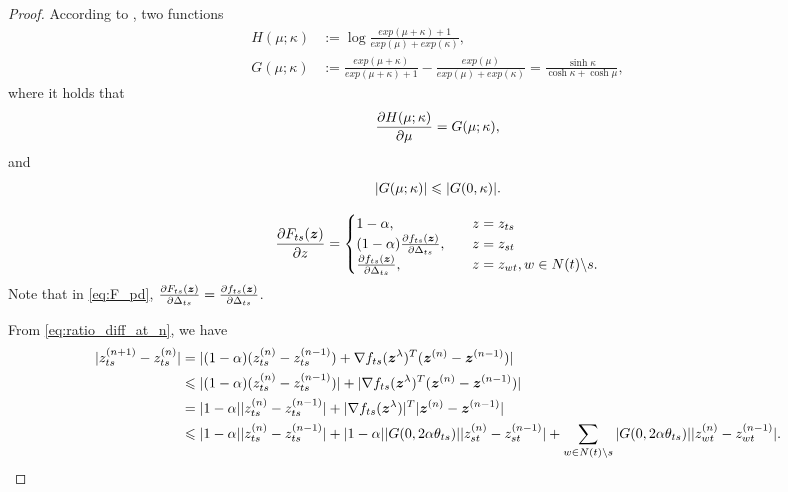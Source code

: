 \documentclass[conference,onecolumn]{IEEEtran}
\begin{document}
\begin{proof}
  According to \cite{roosta2008reweighed_sum_product}, two functions
  \begin{align}
    H(\mu; \kappa) &:= \log \frac{exp(\mu + \kappa) +1}{exp(\mu) + exp(\kappa)}, \nonumber \\
    G(\mu; \kappa) &:= \frac{exp(\mu + \kappa)}{exp(\mu + \kappa) + 1} - \frac{exp(\mu)}{exp(\mu) + exp(\kappa)} = \frac{\sinh{\kappa}}{\cosh{\kappa} + \cosh{\mu}},
  \end{align}
  where it holds that
  \begin{equation}
    \frac{ \partial H(\mu; \kappa)}{\partial \mu} = G(\mu; \kappa),
  \end{equation}
  and
  \begin{equation}
    | G(\mu; \kappa) | \leqslant | G(0, \kappa) |.
  \end{equation}

  \begin{equation}\label{eq:F_pd}
    \frac{ \partial F_{ts}(\bm{z})}{\partial z}=
    \begin{cases}
      1 - \alpha, &\quad z = z_{ts}  \\
      ( 1 - \alpha) \frac{ \partial f_{ts}(\bm{z})}{\partial \Delta_{ts}}, &\quad z = z_{st} \\
      \frac{ \partial f_{ts}(\bm{z})}{\partial \Delta_{ts}}, &\quad z = z_{wt}, w\in N(t)\backslash s.
    \end{cases}
  \end{equation}
  Note that in \eqref{eq:F_pd}, $\frac{ \partial F_{ts}(\bm{z})}{\partial \Delta_{ts}} = \frac{ \partial f_{ts}(\bm{z})}{\partial \Delta_{ts}}$.

  From \eqref{eq:ratio_diff_at_n}, we have
  \begin{align}\label{eq:ratio_cvg_step}
    | z_{ts}^{(n+1)} - z_{ts}^{(n)} | & = | (1-\alpha) (z_{ts}^{(n)} - z_{ts}^{(n-1)}) + \nabla f_{ts}(\bm{z}^{\lambda})^{T} (\bm{z}^{(n)} - \bm{z}^{(n-1)}) | \nonumber \\
                                        & \leqslant | (1-\alpha) (z_{ts}^{(n)} - z_{ts}^{(n-1)}) | + | \nabla f_{ts}(\bm{z}^{\lambda})^{T} (\bm{z}^{(n)} - \bm{z}^{(n-1)}) | \nonumber \\
                                        & = |  1 - \alpha | | z_{ts}^{(n)} - z_{ts}^{(n-1)} | + | \nabla f_{ts}(\bm{z}^{\lambda}) |^{T} | \bm{z}^{(n)} - \bm{z}^{(n-1)} | \nonumber \\
                                        & \leqslant |  1 - \alpha | | z_{ts}^{(n)} - z_{ts}^{(n-1)} | + |  1 - \alpha | | G(0, 2 \alpha \theta_{ts}) | | z_{st}^{(n)} - z_{st}^{(n-1)} | + \sum_{w\in N(t)\backslash s} | G(0, 2 \alpha \theta_{ts}) | | z_{wt}^{(n)} - z_{wt}^{(n-1)} |.
  \end{align}


\end{proof}
\end{document}

